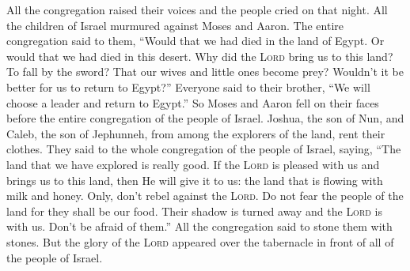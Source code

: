 
\begin{inparaenum}
   All the congregation raised their voices and the people cried on that night.%
   All the children of Israel murmured against Moses and Aaron. The entire congregation said to them, ``Would that we had died in the land of Egypt. Or would that we had died in this desert.%
   Why did the \textsc{Lord} bring us to this land? To fall by the sword? That our wives and little ones become prey? Wouldn't it be better for us to return to Egypt?''%
   Everyone said to their brother, ``We will choose a leader and return to Egypt.''%
   So Moses and Aaron fell on their faces before the entire congregation of the people of Israel.%
   Joshua, the son of Nun, and Caleb, the son of Jephunneh, from among the explorers of the land, rent their clothes.%
   They said to the whole congregation of the people of Israel, saying, ``The land that we have explored is really good.%
   If the \textsc{Lord} is pleased with us and brings us to this land, then He will give it to us: the land that is flowing with milk and honey.%
   Only, don't rebel against the \textsc{Lord}. Do not fear the people of the land for they shall be our food. Their shadow is turned away and the \textsc{Lord} is with us. Don't be afraid of them.''%
   All the congregation said to stone them with stones. But the glory of the \textsc{Lord} appeared over the tabernacle in front of all of the people of Israel.%
  

\end{inparaenum}
